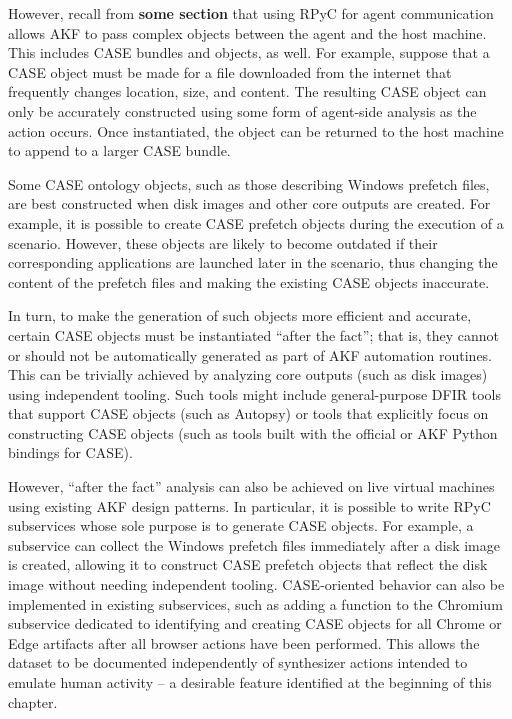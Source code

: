 \documentclass[letterpaper,12pt]{report}
\begin{document}
However, recall from \textbf{some section} that using RPyC for agent
communication allows AKF to pass complex objects between the agent and
the host machine. This includes CASE bundles and objects, as well. For
example, suppose that a CASE object must be made for a file downloaded
from the internet that frequently changes location, size, and content.
The resulting CASE object can only be accurately constructed using some
form of agent-side analysis as the action occurs. Once instantiated, the
object can be returned to the host machine to append to a larger CASE
bundle.

Some CASE ontology objects, such as those describing Windows prefetch
files, are best constructed when disk images and other core outputs are
created. For example, it is possible to create CASE prefetch objects
during the execution of a scenario. However, these objects are likely to
become outdated if their corresponding applications are launched later
in the scenario, thus changing the content of the prefetch files and
making the existing CASE objects inaccurate.

In turn, to make the generation of such objects more efficient and
accurate, certain CASE objects must be instantiated ``after the fact'';
that is, they cannot or should not be automatically generated as part of
AKF automation routines. This can be trivially achieved by analyzing
core outputs (such as disk images) using independent tooling. Such tools
might include general-purpose DFIR tools that support CASE objects (such
as Autopsy) or tools that explicitly focus on constructing CASE objects
(such as tools built with the official or AKF Python bindings for CASE).

However, ``after the fact'' analysis can also be achieved on live
virtual machines using existing AKF design patterns. In particular, it
is possible to write RPyC subservices whose sole purpose is to generate
CASE objects. For example, a subservice can collect the Windows prefetch
files immediately after a disk image is created, allowing it to
construct CASE prefetch objects that reflect the disk image without
needing independent tooling. CASE-oriented behavior can also be
implemented in existing subservices, such as adding a function to the
Chromium subservice dedicated to identifying and creating CASE objects
for all Chrome or Edge artifacts after all browser actions have been
performed. This allows the dataset to be documented independently of
synthesizer actions intended to emulate human activity -- a desirable
feature identified at the beginning of this chapter.
\end{document}
